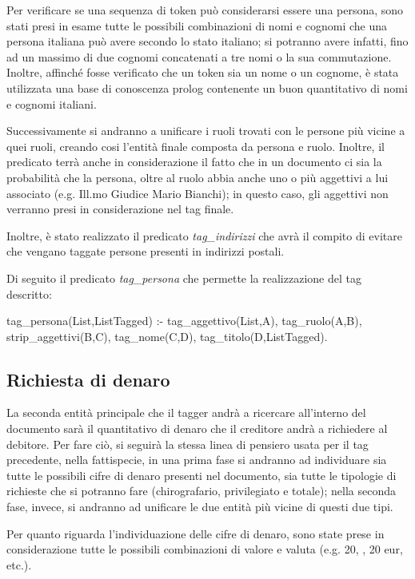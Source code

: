 Per verificare se una sequenza di token può considerarsi essere una persona, sono stati presi in esame tutte le possibili combinazioni di nomi e cognomi che una persona italiana può avere secondo lo stato italiano; si potranno avere infatti, fino ad un massimo di due cognomi concatenati a tre nomi o la sua commutazione. Inoltre, affinché fosse verificato che un token sia un nome o un cognome, è stata utilizzata una base di conoscenza prolog contenente un buon quantitativo di nomi e cognomi italiani.

Successivamente si andranno a unificare i ruoli trovati con le persone più vicine a quei ruoli, creando cosi l'entità finale composta da persona e ruolo.
Inoltre, il predicato terrà anche in considerazione il fatto che in un documento ci sia la probabilità che la persona, oltre al ruolo abbia anche uno o più aggettivi a lui associato (e.g. Ill.mo Giudice Mario Bianchi); in questo caso, gli aggettivi non verranno presi in considerazione nel tag finale.

Inoltre, è stato realizzato il predicato \emph{tag\_indirizzi} che avrà il compito di evitare che vengano taggate persone presenti in indirizzi postali.

Di seguito il predicato \emph{tag\_persona} che permette la realizzazione del tag descritto:

\begin{prologcode}
tag_persona(List,ListTagged) :-
    tag_aggettivo(List,A),
    tag_ruolo(A,B),
    strip_aggettivi(B,C),
    tag_nome(C,D),
    tag_titolo(D,ListTagged).
\end{prologcode}

\subsection{Richiesta di denaro}
La seconda entità principale che il tagger andrà a ricercare all'interno del documento sarà il quantitativo di denaro che il creditore andrà a richiedere al debitore. Per fare ciò, si seguirà la stessa linea di pensiero usata per il tag precedente, nella fattispecie, in una prima fase si andranno ad individuare sia tutte le possibili cifre di denaro presenti nel documento, sia tutte le tipologie di richieste che si potranno fare (chirografario, privilegiato e totale); nella seconda fase, invece, si andranno ad unificare le due entità più vicine di questi due tipi.

Per quanto riguarda l'individuazione delle cifre di denaro, sono state prese in considerazione tutte le possibili combinazioni di valore e valuta (e.g. 20\texteuro, , 20 eur, etc.).

